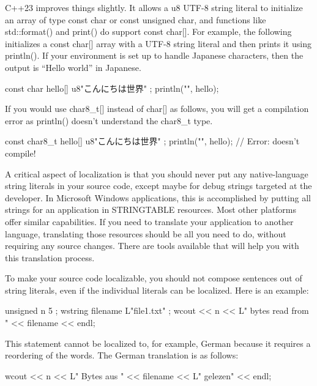 
C++23 improves things slightly. It allows a u8 UTF-8 string literal to initialize an array of type const char or const unsigned char, and functions like std::format() and print() do support const char[]. For example, the following initializes a const char[] array with a UTF-8 string literal and then prints it using println(). If your environment is set up to handle Japanese characters, then the output is “Hello world” in Japanese.

\begin{cpp}
const char hello[] { u8"こんにちは世界" };
println("{}", hello);
\end{cpp}

If you would use char8\_t[] instead of char[] as follows, you will get a compilation error as println() doesn’t understand the char8\_t type.

\begin{cpp}
const char8_t hello[] { u8"こんにちは世界" };
println("{}", hello); // Error: doesn't compile!
\end{cpp}


A critical aspect of localization is that you should never put any native-language string literals in your source code, except maybe for debug strings targeted at the developer. In Microsoft Windows applications, this is accomplished by putting all strings for an application in STRINGTABLE resources. Most other platforms offer similar capabilities. If you need to translate your application to another language, translating those resources should be all you need to do, without requiring any source changes.
There are tools available that will help you with this translation process.

To make your source code localizable, you should not compose sentences out of string literals, even if the individual literals can be localized. Here is an example:

\begin{cpp}
unsigned n { 5 };
wstring filename { L"file1.txt" };
wcout << n << L" bytes read from " << filename << endl;
\end{cpp}

This statement cannot be localized to, for example, German because it requires a reordering of the words. The German translation is as follows:

\begin{cpp}
wcout << n << L" Bytes aus " << filename << L" gelezen" << endl;
\end{cpp}

